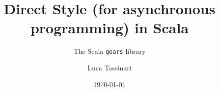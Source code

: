 \documentclass[aspectratio=1610,xcolor=dvipsnames,handout]{beamer}
\title{Direct Style (for asynchronous programming) in Scala}
\subtitle{The Scala \texttt{gears} library}
\author{Luca Tassinari}
\date{\today} %
\begin{document}
\begin{frame}
  \titlepage
\end{frame}


\end{document}
